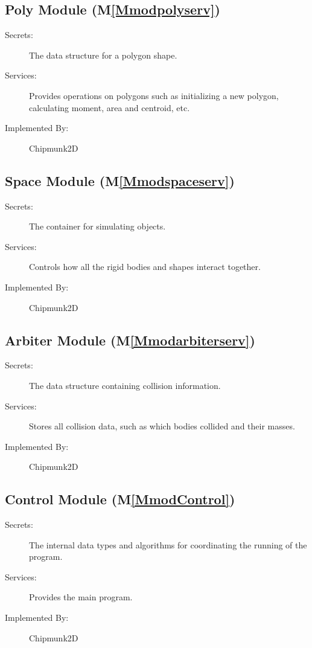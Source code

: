 \documentclass[12pt]{article}
\begin{document}
\subsection{Poly Module (M\ref{Mmodpolyserv})}
\label{Sec:PM()}
\begin{description}
\item[Secrets:]The data structure for a polygon shape.
\item[Services:]Provides operations on polygons such as initializing a new polygon, calculating moment, area and centroid, etc.
\item[Implemented By:]Chipmunk2D
\end{description}
\subsection{Space Module (M\ref{Mmodspaceserv})}
\label{Sec:SM()}
\begin{description}
\item[Secrets:]The container for simulating objects.
\item[Services:]Controls how all the rigid bodies and shapes interact together.
\item[Implemented By:]Chipmunk2D
\end{description}
\subsection{Arbiter Module (M\ref{Mmodarbiterserv})}
\label{Sec:AM()}
\begin{description}
\item[Secrets:]The data structure containing collision information.
\item[Services:]Stores all collision data, such as which bodies collided and their masses.
\item[Implemented By:]Chipmunk2D
\end{description}
\subsection{Control Module (M\ref{MmodControl})}
\label{Sec:CM()}
\begin{description}
\item[Secrets:]The internal data types and algorithms for coordinating the running of the program.
\item[Services:]Provides the main program.
\item[Implemented By:]Chipmunk2D
\end{description}
\end{document}
